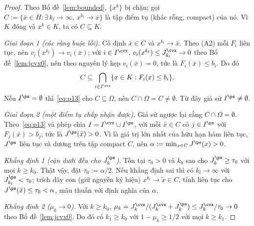 \begin{proof}
Theo Bổ đề~\ref{lem:bounded}, $\{x^k\}$ bị chặn; gọi
$C:=\{\bar x\in H:\exists\,k_l\to\infty,\ x^{k_l}\to\bar x\}$ là tập điểm tụ (khác rỗng, compact)
của nó. Vì $K$ đóng và $x^k\in K$, ta có $C\subseteq K$.

\emph{Giai đoạn 1 (các ràng buộc lồi).} Cố định $\bar x\in C$ và $x^{k_l}\to\bar x$. Theo (A2) mỗi
$F_i$ liên tục, nên $v_i(x^{k_l})\to v_i(\bar x)$; với $i\in I^{\cvx}$,
$v_i(x^{k_l})\le J^{\cvx}_{k_l}\to0$ theo Bổ đề~\ref{lem:jcvx0}, nên theo nguyên lý kẹp
$v_i(\bar x)=0$, tức là $F_i(\bar x)\le b_i$. Do đó
\begin{equation}\label{eq:p13}
C\subseteq\bigcap_{i\in I^{\cvx}}\{x\in K:F_i(x)\le b_i\}.
\end{equation}
Nếu $I^{\ps}=\emptyset$ thì~\eqref{eq:p13} cho $C\subseteq\Omega$,
nên $C\cap\Omega=C\ne\emptyset$.
Từ đây giả sử $I^{\ps}\ne\emptyset$.

\emph{Giai đoạn 2 (một điểm tụ chấp nhận được).} Giả sử ngược lại rằng
$C\cap\Omega=\emptyset$. Theo~\eqref{eq:p13} và phép chia $I=I^{\cvx}\cup I^{\ps}$, với
mỗi $\bar x\in C$ có $j\in I^{\ps}$ với $F_j(\bar x)>b_j$, tức là
$J^{\ps}(\bar x)>0$. Vì là giá trị lớn nhất của hữu hạn hàm liên tục, $J^{\ps}$
liên tục và dương trên tập compact $C$, nên $\alpha:=\min_{x\in C}J^{\ps}(x)>0$.

\smallskip
\emph{Khẳng định 1 (cận dưới đều cho $J^{\ps}_k$).} Tồn tại $\tau_0>0$ và $k_0$
sao cho $J^{\ps}_k\ge\tau_0$ với mọi $k\ge k_0$. Thật vậy, đặt $\tau_0:=\alpha/2$. Nếu khẳng định
sai thì có $k_l\to\infty$ với $J^{\ps}_{k_l}<\tau_0$; trích dãy con (giữ nguyên
ký hiệu) $x^{k_l}\to\tilde x\in C$, tính liên tục cho $J^{\ps}(\tilde x)\le\tau_0<\alpha$,
mâu thuẫn với định nghĩa của $\alpha$.

\smallskip
\emph{Khẳng định 2 ($\mu_k\to0$).} Với $k\ge k_0$,
$\mu_k=J^{\cvx}_k/(J^{\cvx}_k+J^{\ps}_k)\le J^{\cvx}_k/\tau_0\to0$ theo
Bổ đề~\ref{lem:jcvx0}. Do đó có $k_1\ge k_0$ với $1-\mu_k\ge1/2$ với mọi $k\ge k_1$.


\end{proof}
